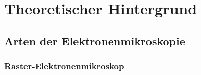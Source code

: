 
\chapter{Theoretischer Hintergrund}
\label{chap:fvz}

\section{Arten der Elektronenmikroskopie}
\label{sec:artenEM}

\subsection*{Raster-Elektronenmikroskop}
